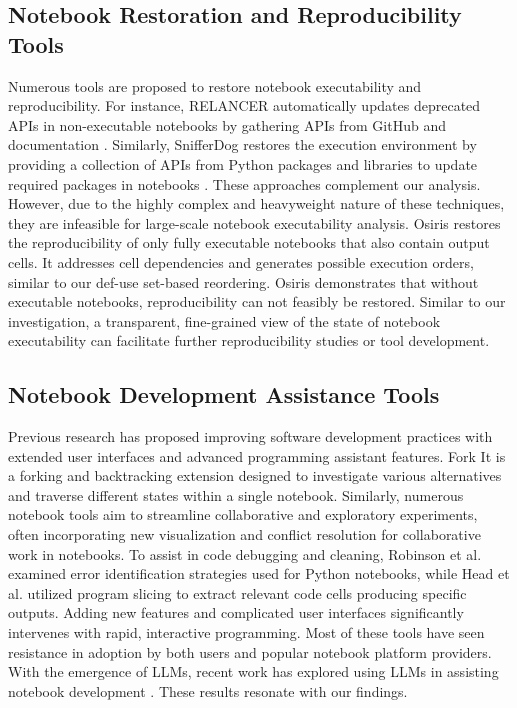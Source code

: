     \subsection{Notebook Restoration and Reproducibility Tools}
        Numerous tools are proposed to restore notebook executability and reproducibility. For instance, RELANCER automatically updates deprecated APIs in non-executable notebooks by gathering APIs from GitHub and documentation \cite{Zhu2021}. Similarly, SnifferDog restores the execution environment by providing a collection of APIs from Python packages and libraries to update required packages in notebooks \cite{Wang2021}. These approaches complement our analysis. However, due to the highly complex and heavyweight nature of these techniques, they are infeasible for large-scale notebook executability analysis. 
        Osiris \cite{Wang2020} restores the reproducibility of only fully executable notebooks that also contain output cells. It addresses cell dependencies and generates possible execution orders, similar to our def-use set-based reordering. Osiris demonstrates that without executable notebooks, reproducibility can not feasibly be restored. Similar to our investigation, a transparent, fine-grained view of the state of notebook executability can facilitate further reproducibility studies or tool development.

    
    \subsection{Notebook Development Assistance Tools}
        Previous research has proposed improving software development practices with extended user interfaces and advanced programming assistant features. Fork It \cite{Weinman2021} is a forking and backtracking extension designed to investigate various alternatives and traverse different states within a single notebook. Similarly, numerous notebook tools \cite{Rule2018CellFolding, Li2024, Zhu2024Facilitating, Wang202Conflict, SuperNOVA} aim to streamline collaborative and exploratory experiments, often incorporating new visualization and conflict resolution for collaborative work in notebooks. To assist in code debugging and cleaning,  Robinson et al. \cite{Robinson2022} examined error identification strategies used for Python notebooks, while Head et al. \cite{Head2019} utilized program slicing to extract relevant code cells producing specific outputs.  
        Adding new features and complicated user interfaces significantly intervenes with rapid, interactive programming. Most of these tools have seen resistance in adoption by both users and popular notebook platform providers. With the emergence of LLMs, recent work has explored using LLMs in assisting notebook development \cite{McNutt2023, Wang2024, Weber2024Computational, grotov2024untangling}. These results resonate with our findings.  

        
    